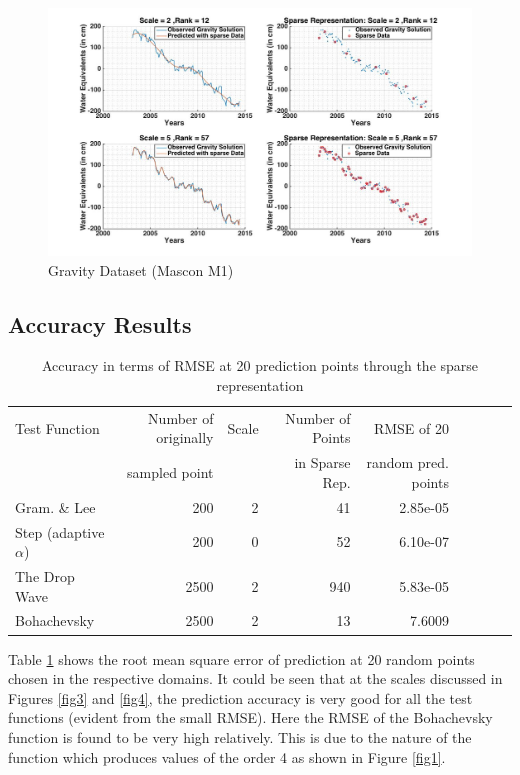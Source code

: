 \documentclass[procedia]{easychair}
\begin{document}
\begin{figure}[]  %
	\centering
	\includegraphics[width=4.5in]{ablation.jpg}
	\caption[Optional caption]{Gravity Dataset (Mascon M1)}
	\label{fig7} %
\end{figure}



\subsection{Accuracy Results}

\begin{table}[htp]
	\begin{centering}
		\begin{tabular}{lrrrrrrrr}
		\hline
		Test Function            &Number of originally &Scale  &Number of Points &RMSE of 20  \\
		                      &sampled point  & &in Sparse Rep. &random pred. points \\
		\hline
		Gram. \&  Lee      &200 &2 &41 &2.85e-05 \\
		Step (adaptive $\alpha$)      &200 &0 &52  &6.10e-07 \\
		The Drop Wave             &2500 &2 &940 &5.83e-05\\
		Bohachevsky      &2500 &2 &13 &7.6009 \\

		\hline
		\end{tabular}
		\caption{Accuracy in terms of RMSE at 20 prediction points through the sparse representation}
		\label{tab1}
	\end{centering}
\end{table}



Table \ref{tab1} shows the root mean square error of prediction at 20 random points chosen in the respective domains. It could be seen that at the scales discussed in Figures \ref{fig3}  and \ref{fig4}, the prediction accuracy is very good for all the test functions (evident from the small RMSE). Here the RMSE of the Bohachevsky function is found to be very high relatively. This is due to the nature of the function which produces values of the order 4 as shown in Figure \ref{fig1}. 
\end{document}

